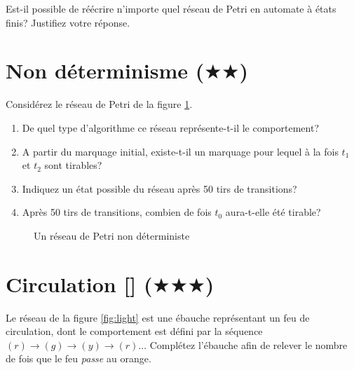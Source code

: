 \documentclass[a4paper, titlepage]{article}
\numberwithin{figure}{section}
\numberwithin{table}{section}
\begin{document}
Est-il possible de réécrire n'importe quel réseau de Petri en automate à états finis? Justifiez votre réponse.

\section{Non déterminisme ($\bigstar$$\bigstar$)}

Considérez le réseau de Petri de la figure \ref{fig:exclusion}.

\begin{enumerate}
\item De quel type d'algorithme ce réseau représente-t-il le comportement?
\item A partir du marquage initial, existe-t-il un marquage pour lequel à la fois $t_1$ et $t_2$ sont tirables?
\item Indiquez un état possible du réseau après 50 tirs de transitions?
\item Après 50 tirs de transitions, combien de fois $t_0$ aura-t-elle été tirable?
\end{enumerate}

\begin{figure}[ht]
\centering
{}
\caption{Un réseau de Petri non déterministe}
\label{fig:exclusion}
\end{figure}

\newpage
\section{Circulation [\Keyboard] ($\bigstar$$\bigstar$$\bigstar$)}

Le réseau de la figure \ref{fig:light} est une ébauche représentant un feu de circulation, dont le comportement est défini par la séquence $(r) \rightarrow (g) \rightarrow (y) \rightarrow (r) \dots$ Complétez l'ébauche afin de relever le nombre de fois que le feu \emph{passe} au orange.
\end{document}
